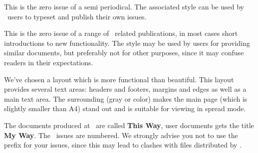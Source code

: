 
%

\usemodule[mag-01]

\startbuffer[abstract]
    This is the zero issue of a semi periodical. The associated style can be used
    by \CONTEXT\ users to typeset and publish their own issues.
\stopbuffer

\startdocument
  [title={Introduction},
   subtitle={Welcome},
   author={Hans Hagen},
   affiliation=PRAGMA ADE,
   date=Januari 2003,
   number=0 \MKIV]

This is the zero issue of a range of \CONTEXT\ related publications, in most
cases short introductions to new functionality. The style may be used by users
for providing similar documents, but preferably not for other purposes, since it
may confuse readers in their expectations.

We've chosen a layout which is more functional than beautiful. This layout
provides several text areas: headers and footers, margins and edges as well as a
main text area. The surrounding (gray or color) makes the main page (which is
slightly smaller than A4) stand out and is suitable for viewing in spread mode.

The documents produced at \PRAGMA\ are called {\bf This Way}, user documents gets
the title {\bf My Way}. The \PRAGMA\ issues are numbered. We strongly advise you
not to use the  prefix for your issues, since this may lead to
clashes with files distributed by \PRAGMA.

\stopdocument

